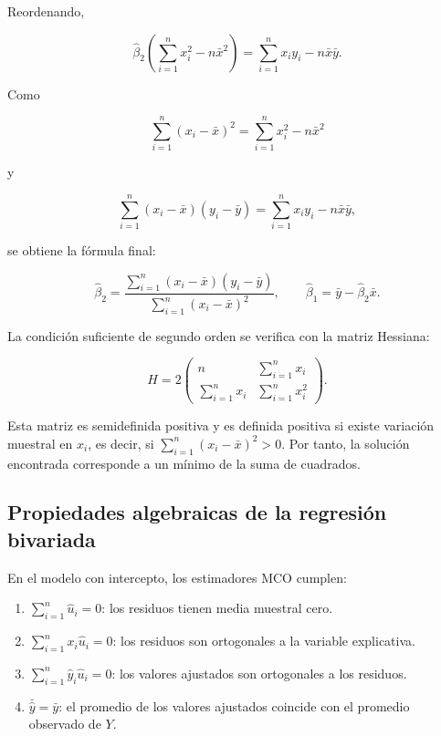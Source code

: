 \documentclass[11pt,a4paper]{article}
\begin{document}
Reordenando,

\[
\hat{\beta}_2\left(\sum_{i=1}^{n}x_i^2-n\bar{x}^{2}\right)
=\sum_{i=1}^{n}x_iy_i-n\bar{x}\bar{y}.
\]

Como

\[
\sum_{i=1}^{n}(x_i-\bar{x})^2=\sum_{i=1}^{n}x_i^2-n\bar{x}^{2}
\]

y

\[
\sum_{i=1}^{n}(x_i-\bar{x})(y_i-\bar{y})=\sum_{i=1}^{n}x_iy_i-n\bar{x}\bar{y},
\]

se obtiene la fórmula final:

\begin{resultado}
\[
\boxed{\hat{\beta}_2=\frac{\sum_{i=1}^{n}(x_i-\bar{x})(y_i-\bar{y})}{\sum_{i=1}^{n}(x_i-\bar{x})^2}},
\qquad
\boxed{\hat{\beta}_1=\bar{y}-\hat{\beta}_2\bar{x}}.
\]
\end{resultado}

La condición suficiente de segundo orden se verifica con la matriz Hessiana:

\[
H=2
\begin{pmatrix}
n & \sum_{i=1}^{n}x_i \\
\sum_{i=1}^{n}x_i & \sum_{i=1}^{n}x_i^2
\end{pmatrix}.
\]

Esta matriz es semidefinida positiva y es definida positiva si existe variación muestral en \(x_i\), es decir, si \(\sum_{i=1}^{n}(x_i-\bar{x})^2>0\). Por tanto, la solución encontrada corresponde a un mínimo de la suma de cuadrados.

\subsection{Propiedades algebraicas de la regresión bivariada}

En el modelo con intercepto, los estimadores MCO cumplen:

\begin{enumerate}[noitemsep]
    \item \(\sum_{i=1}^{n}\hat{u}_i=0\): los residuos tienen media muestral cero.
    \item \(\sum_{i=1}^{n}x_i\hat{u}_i=0\): los residuos son ortogonales a la variable explicativa.
    \item \(\sum_{i=1}^{n}\hat{y}_i\hat{u}_i=0\): los valores ajustados son ortogonales a los residuos.
    \item \(\bar{\hat{y}}=\bar{y}\): el promedio de los valores ajustados coincide con el promedio observado de \(Y\).
\end{enumerate}
\end{document}
